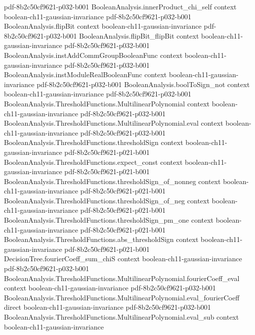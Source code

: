 \begin{theorem}
  {pdf-8b2c50cf9621-p032-b001}
\proofstep
  {BooleanAnalysis.innerProduct_chi_self}
  {context}
  {boolean-ch11-gaussian-invariance}
  {pdf-8b2c50cf9621-p032-b001}
\proofstep
  {BooleanAnalysis.flipBit}
  {context}
  {boolean-ch11-gaussian-invariance}
  {pdf-8b2c50cf9621-p032-b001}
\proofstep
  {BooleanAnalysis.flipBit_flipBit}
  {context}
  {boolean-ch11-gaussian-invariance}
  {pdf-8b2c50cf9621-p032-b001}
\proofstep
  {BooleanAnalysis.instAddCommGroupBooleanFunc}
  {context}
  {boolean-ch11-gaussian-invariance}
  {pdf-8b2c50cf9621-p032-b001}
\proofstep
  {BooleanAnalysis.instModuleRealBooleanFunc}
  {context}
  {boolean-ch11-gaussian-invariance}
  {pdf-8b2c50cf9621-p032-b001}
\proofstep
  {BooleanAnalysis.boolToSign_not}
  {context}
  {boolean-ch11-gaussian-invariance}
  {pdf-8b2c50cf9621-p032-b001}
\proofstep
  {BooleanAnalysis.ThresholdFunctions.MultilinearPolynomial}
  {context}
  {boolean-ch11-gaussian-invariance}
  {pdf-8b2c50cf9621-p032-b001}
\proofstep
  {BooleanAnalysis.ThresholdFunctions.MultilinearPolynomial.eval}
  {context}
  {boolean-ch11-gaussian-invariance}
  {pdf-8b2c50cf9621-p032-b001}
\proofstep
  {BooleanAnalysis.ThresholdFunctions.thresholdSign}
  {context}
  {boolean-ch11-gaussian-invariance}
  {pdf-8b2c50cf9621-p021-b001}
\proofstep
  {BooleanAnalysis.ThresholdFunctions.expect_const}
  {context}
  {boolean-ch11-gaussian-invariance}
  {pdf-8b2c50cf9621-p021-b001}
\proofstep
  {BooleanAnalysis.ThresholdFunctions.thresholdSign_of_nonneg}
  {context}
  {boolean-ch11-gaussian-invariance}
  {pdf-8b2c50cf9621-p021-b001}
\proofstep
  {BooleanAnalysis.ThresholdFunctions.thresholdSign_of_neg}
  {context}
  {boolean-ch11-gaussian-invariance}
  {pdf-8b2c50cf9621-p021-b001}
\proofstep
  {BooleanAnalysis.ThresholdFunctions.thresholdSign_pm_one}
  {context}
  {boolean-ch11-gaussian-invariance}
  {pdf-8b2c50cf9621-p021-b001}
\proofstep
  {BooleanAnalysis.ThresholdFunctions.abs_thresholdSign}
  {context}
  {boolean-ch11-gaussian-invariance}
  {pdf-8b2c50cf9621-p021-b001}
\proofstep
  {DecisionTree.fourierCoeff_sum_chiS}
  {context}
  {boolean-ch11-gaussian-invariance}
  {pdf-8b2c50cf9621-p032-b001}
\proofstep
  {BooleanAnalysis.ThresholdFunctions.MultilinearPolynomial.fourierCoeff_eval}
  {context}
  {boolean-ch11-gaussian-invariance}
  {pdf-8b2c50cf9621-p032-b001}
\proofstep
  {BooleanAnalysis.ThresholdFunctions.MultilinearPolynomial.eval_fourierCoeff}
  {direct}
  {boolean-ch11-gaussian-invariance}
  {pdf-8b2c50cf9621-p032-b001}
\proofstep
  {BooleanAnalysis.ThresholdFunctions.MultilinearPolynomial.eval_sub}
  {context}
  {boolean-ch11-gaussian-invariance}

\end{theorem}
